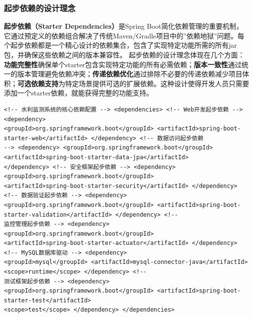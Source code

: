 \subsubsection{起步依赖的设计理念}\label{ux8d77ux6b65ux4f9dux8d56ux7684ux8bbeux8ba1ux7406ux5ff5} \textbf{起步依赖（Starter
Dependencies）}是Spring
Boot简化依赖管理的重要机制，它通过预定义的依赖组合解决了传统Maven/Gradle项目中的''依赖地狱''问题。每个起步依赖都是一个精心设计的依赖集合，包含了实现特定功能所需的所有jar包，并确保这些依赖之间的版本兼容性。
起步依赖的设计理念体现在几个方面：\textbf{功能完整性}确保单个starter包含实现特定功能的所有必需依赖；\textbf{版本一致性}通过统一的版本管理避免依赖冲突；\textbf{传递依赖优化}通过排除不必要的传递依赖减少项目体积；\textbf{可选依赖支持}为特定场景提供可选的扩展依赖。这种设计使得开发人员只需要添加一个starter依赖，就能获得完整的功能支持。
\begin{lstlisting}[style=xml] <!-- 水利监测系统的核心依赖配置 --> <dependencies> <!-- Web开发起步依赖 --> <dependency>
<groupId>org.springframework.boot</groupId> <artifactId>spring-boot-starter-web</artifactId> </dependency> <!-- 数据访问起步依赖
--> <dependency> <groupId>org.springframework.boot</groupId> <artifactId>spring-boot-starter-data-jpa</artifactId>
</dependency> <!-- 安全框架起步依赖 --> <dependency> <groupId>org.springframework.boot</groupId>
<artifactId>spring-boot-starter-security</artifactId> </dependency> <!-- 数据验证起步依赖 --> <dependency>
<groupId>org.springframework.boot</groupId> <artifactId>spring-boot-starter-validation</artifactId> </dependency> <!--
监控管理起步依赖 --> <dependency> <groupId>org.springframework.boot</groupId>
<artifactId>spring-boot-starter-actuator</artifactId> </dependency> <!-- MySQL数据库驱动 --> <dependency>
<groupId>mysql</groupId> <artifactId>mysql-connector-java</artifactId> <scope>runtime</scope> </dependency> <!--
测试框架起步依赖 --> <dependency> <groupId>org.springframework.boot</groupId> <artifactId>spring-boot-starter-test</artifactId>
<scope>test</scope> </dependency> </dependencies> \end{lstlisting}
